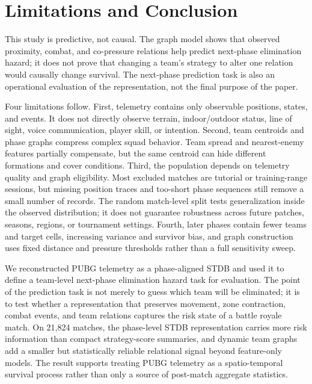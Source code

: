 \section{Limitations and Conclusion}
\label{sec:limitations}

This study is predictive, not causal. The graph model shows that observed
proximity, combat, and co-pressure relations help predict next-phase
elimination hazard; it does not prove that changing a team's strategy to
alter one relation would causally change survival. The next-phase prediction
task is also an operational evaluation of the representation, not the final
purpose of the paper.

Four limitations follow. First, telemetry contains only observable positions,
states, and events. It does not directly observe terrain, indoor/outdoor
status, line of sight, voice communication, player skill, or intention. Second,
team centroids and phase graphs compress complex squad behavior. Team spread
and nearest-enemy features partially compensate, but the same centroid can
hide different formations and cover conditions. Third, the population depends
on telemetry quality and graph eligibility. Most excluded matches are tutorial
or training-range sessions, but missing position traces and too-short phase
sequences still remove a small number of records. The random match-level split
tests generalization inside the observed distribution; it does not guarantee
robustness across future patches, seasons, regions, or tournament settings.
Fourth, later phases contain fewer teams and target cells, increasing
variance and survivor bias, and graph construction uses fixed distance and
pressure thresholds rather than a full sensitivity sweep.

We reconstructed PUBG telemetry as a phase-aligned STDB and used it to define
a team-level next-phase elimination hazard task for evaluation. The point of
the prediction task is not merely to guess which team will be eliminated; it is
to test whether a representation that preserves movement, zone contraction,
combat events, and team relations captures the risk state of a battle royale
match. On 21,824 matches, the phase-level STDB representation carries more
risk information than compact strategy-score summaries, and dynamic team
graphs add a smaller but statistically reliable relational signal beyond
feature-only models. The result supports treating PUBG telemetry as a
spatio-temporal survival process rather than only a source of post-match
aggregate statistics.

